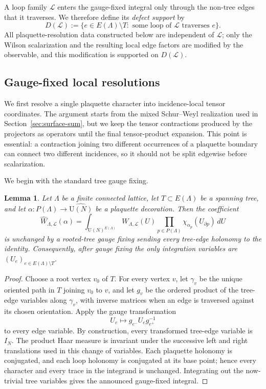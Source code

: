 \documentclass[11pt,a4paper,reqno]{article}
\newtheorem{lemma}[theorem]{Lemma}
\theoremstyle{definition}
\theoremstyle{remark}
\newcommand\U{{\mathrm U}}
\newcommand\Lc{{\mathcal{L}}}
\begin{document}
A loop family $\Lc$ enters the gauge-fixed integral only through the non-tree edges that it traverses. We therefore define its \emph{defect support} by
\begin{equation}\label{eq:defect-support-sec3}
D(\Lc):=\{e\in E(\Lambda)\setminus T:\text{ some loop of }\Lc\text{ traverses }e\}.
\end{equation}
All plaquette-resolution data constructed below are independent of $\Lc$; only the Wilson scalarization and the resulting local edge factors are modified by the observable, and this modification is supported on $D(\Lc)$.

\subsection{Gauge-fixed local resolutions}\label{sec:local-resolution}

We first resolve a single plaquette character into incidence-local tensor coordinates. The argument starts from the mixed Schur--Weyl realization used in Section~\ref{sec:surface-sum}, but we keep the tensor contractions produced by the projectors as operators until the final tensor-product expansion. This point is essential: a contraction joining two different occurrences of a plaquette boundary can connect two different incidences, so it should not be split edgewise before scalarization.

We begin with the standard tree gauge fixing.

\begin{lemma}\label{lem:gauge-fixing-top-coeff}
Let $\Lambda$ be a finite connected lattice, let $T\subset E(\Lambda)$ be a spanning tree, and let $\alpha:P(\Lambda)\to\widehat{\U(N)}$ be a plaquette decoration. Then the coefficient
\[
\widehat W_{\Lambda,\Lc}(\alpha)
=\int_{\U(N)^{E(\Lambda)}}W_{\Lambda,\Lc}(U)
\prod_{p\in P(\Lambda)}\chi_{\alpha_p}(U_{\partial p})\,dU
\]
is unchanged by a rooted-tree gauge fixing sending every tree-edge holonomy to the identity. Consequently, after gauge fixing the only integration variables are $(U_e)_{e\in E(\Lambda)\setminus T}$.
\end{lemma}

\begin{proof}
Choose a root vertex $v_0$ of $T$. For every vertex $v$, let $\gamma_v$ be the unique oriented path in $T$ joining $v_0$ to $v$, and let $g_v$ be the ordered product of the tree-edge variables along $\gamma_v$, with inverse matrices when an edge is traversed against its chosen orientation. Apply the gauge transformation
\[
U_e\longmapsto g_{e^-}U_eg_{e^+}^{-1}
\]
to every edge variable. By construction, every transformed tree-edge variable is $I_N$. The product Haar measure is invariant under the successive left and right translations used in this change of variables. Each plaquette holonomy is conjugated, and each loop holonomy is conjugated at its base point; hence every character and every trace in the integrand is unchanged. Integrating out the now-trivial tree variables gives the announced gauge-fixed integral.
\end{proof}
\end{document}
